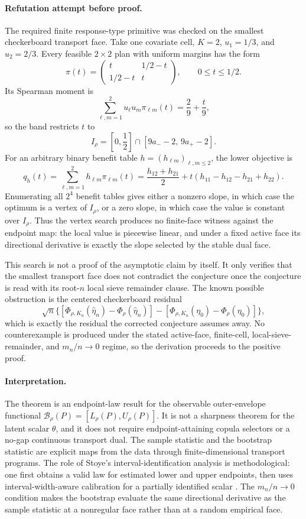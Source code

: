 \paragraph{Refutation attempt before proof.}
The required finite response-type primitive was checked on the smallest checkerboard transport face.  Take one covariate cell, \(K=2\), \(u_1=1/3\), and \(u_2=2/3\).  Every feasible \(2\times2\) plan with uniform margins has the form
\[
\pi(t)=
\begin{pmatrix}
t & 1/2-t\\
1/2-t & t
\end{pmatrix},
\qquad 0\le t\le 1/2.
\]
Its Spearman moment is
\[
\sum_{\ell,m=1}^2u_\ell u_m\pi_{\ell m}(t)=\frac{2}{9}+\frac{t}{9},
\]
so the band restricts \(t\) to
\[
I_\rho=\left[0,\frac12\right]\cap[9a_- -2,\,9a_+ -2].
\]
For an arbitrary binary benefit table \(h=(h_{\ell m})_{\ell,m\le2}\), the lower objective is
\[
q_h(t)=\sum_{\ell,m=1}^2 h_{\ell m}\pi_{\ell m}(t)
=\frac{h_{12}+h_{21}}{2}
+t(h_{11}-h_{12}-h_{21}+h_{22}).
\]
Enumerating all \(2^4\) benefit tables gives either a nonzero slope, in which case the optimum is a vertex of \(I_\rho\), or a zero slope, in which case the value is constant over \(I_\rho\).  Thus the vertex search produces no finite-face witness against the endpoint map: the local value is piecewise linear, and under a fixed active face its directional derivative is exactly the slope selected by the stable dual face.

This search is not a proof of the asymptotic claim by itself.  It only verifies that the smallest transport face does not contradict the conjecture once the conjecture is read with its root-\(n\) local sieve remainder clause.  The known possible obstruction is the centered checkerboard residual
\[
\sqrt n\{[\Phi_{\rho,K_n}(\widehat\eta_n)-\Phi_\rho(\widehat\eta_n)]
-[\Phi_{\rho,K_n}(\eta_0)-\Phi_\rho(\eta_0)]\},
\]
which is exactly the residual the corrected conjecture assumes away.  No counterexample is produced under the stated active-face, finite-cell, local-sieve-remainder, and \(m_n/n\to0\) regime, so the derivation proceeds to the positive proof.

\paragraph{Interpretation.}
The theorem is an endpoint-law result for the observable outer-envelope functional \(\mathcal B_\rho(P)=[L_\rho(P),U_\rho(P)]\).  It is not a sharpness theorem for the latent scalar \(\theta\), and it does not require endpoint-attaining copula selectors or a no-gap continuous transport dual.  The sample statistic and the bootstrap statistic are explicit maps from the data through finite-dimensional transport programs.  The role of Stoye's interval-identification analysis is methodological: one first obtains a valid law for estimated lower and upper endpoints, then uses interval-width-aware calibration for a partially identified scalar \cite{Stoye2009MoreCI}.  The \(m_n/n\to0\) condition makes the bootstrap evaluate the same directional derivative as the sample statistic at a nonregular face rather than at a random empirical face.

